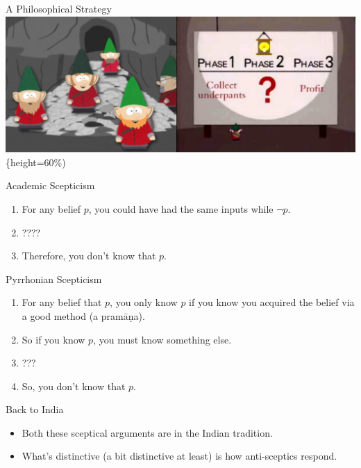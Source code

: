 \documentclass[
  17pt,
  letterpaper,
  ignorenonframetext,
  aspectratio=169,
  handout]{beamer}
\providecommand{\tightlist}{%
  \setlength{\itemsep}{0pt}\setlength{\parskip}{0pt}}\usepackage{longtable,booktabs,array}
\begin{document}
\begin{frame}{A Philosophical Strategy}
\protect\hypertarget{a-philosophical-strategy}{}
\includegraphics{../images/underpants.jpeg}\{height=60\%)
\end{frame}

\begin{frame}{Academic Scepticism}
\protect\hypertarget{academic-scepticism}{}
\begin{enumerate}[<+->]
\tightlist
\item
  For any belief \(p\), you could have had the same inputs while
  \(\neg p\).
\item
  ????
\item
  Therefore, you don't know that \(p\).
\end{enumerate}
\end{frame}

\begin{frame}{Pyrrhonian Scepticism}
\protect\hypertarget{pyrrhonian-scepticism}{}
\begin{enumerate}[<+->]
\tightlist
\item
  For any belief that \(p\), you only know \(p\) if you know you
  acquired the belief via a good method (a pramāṇa).
\item
  So if you know \(p\), you must know something else.
\item
  ???
\item
  So, you don't know that \(p\).
\end{enumerate}
\end{frame}

\begin{frame}{Back to India}
\protect\hypertarget{back-to-india}{}
\begin{itemize}[<+->]
\tightlist
\item
  Both these sceptical arguments are in the Indian tradition.
\item
  What's distinctive (a bit distinctive at least) is how anti-sceptics
  respond.
\end{itemize}
\end{frame}
\end{document}
